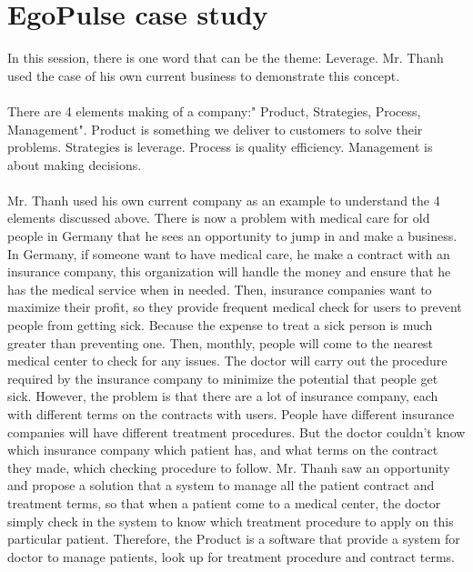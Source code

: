 \documentclass[a4paper, 11pt]{article} %
\begin{document}
\section*{EgoPulse case study}
In this session, there is one word that can be the theme: Leverage. Mr. Thanh used the case of his own current business to demonstrate this concept.
\\
\\
There are 4 elements making of a company:" Product, Strategies, Process, Management". Product is something we deliver to customers to solve their problems. Strategies is leverage. Process is quality efficiency. Management is about making decisions. 
\\
\\
	Mr. Thanh used his own current company as an example to understand the 4 elements discussed above. There is now a problem with medical care for old people in Germany that he sees an opportunity to jump in and make a business. In Germany, if someone want to have medical care, he make a contract with an insurance company, this organization will handle the money and ensure that he has the medical service when in needed. Then, insurance companies want to maximize their profit, so they provide frequent medical check for users to prevent people from getting sick. Because the expense to treat a sick person is much greater than preventing one. Then, monthly, people will come to the nearest medical center to check for any issues. The doctor will carry out the procedure required by the insurance company to minimize the potential that people get sick. However, the problem is that there are a lot of insurance company, each with different terms on the contracts with users. People have different insurance companies will have different treatment procedures. But the doctor couldn't know which insurance company which patient has, and what terms on the contract they made, which checking procedure to follow. Mr. Thanh saw an opportunity and propose a solution that a system to manage all the patient contract and treatment terms, so that when a patient come to a medical center, the doctor simply check in the system to know which treatment procedure to apply on this particular patient. Therefore, the Product is a software that provide a system for doctor to manage patients, look up for treatment procedure and contract terms. 
\\
\\
\end{document}
